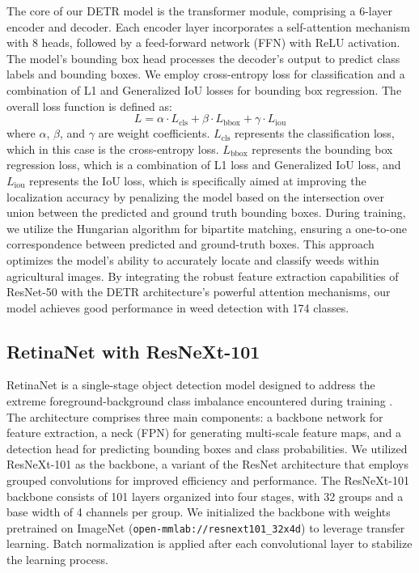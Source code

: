 The core of our DETR model is the transformer module, comprising a 6-layer encoder and decoder. Each encoder layer incorporates a self-attention mechanism with 8 heads, followed by a feed-forward network (FFN) with ReLU activation. The model's bounding box head processes the decoder's output to predict class labels and bounding boxes. We employ cross-entropy loss for classification and a combination of L1 and Generalized IoU losses for bounding box regression. The overall loss function \cite{yin2019context} is defined as:
\vspace{-0.2cm}
\begin{equation}
L = \alpha \cdot L_{\text{cls}} + \beta \cdot L_{\text{bbox}} + \gamma \cdot L_{\text{iou}}
\end{equation}
where \(\alpha\), \(\beta\), and \(\gamma\) are weight coefficients. \( L_{\text{cls}} \) represents the classification loss, which in this case is the cross-entropy loss. \( L_{\text{bbox}} \) represents the bounding box regression loss, which is a combination of L1 loss and Generalized IoU loss, and \( L_{\text{iou}} \) 	represents the IoU loss, which is specifically aimed at improving the localization accuracy by penalizing the model based on the intersection over union between the predicted and ground truth bounding boxes. During training, we utilize the Hungarian algorithm \cite{ye2020cost} for bipartite matching, ensuring a one-to-one correspondence between predicted and ground-truth boxes. This approach optimizes the model's ability to accurately locate and classify weeds within agricultural images. By integrating the robust feature extraction capabilities of ResNet-50 with the DETR architecture's powerful attention mechanisms, our model achieves good performance in weed detection with 174 classes.

\subsection{RetinaNet with ResNeXt-101}

RetinaNet is a single-stage object detection model designed to address the extreme foreground-background class imbalance encountered during training \cite{li2019light}. The architecture comprises three main components: a backbone network for feature extraction, a neck (FPN) for generating multi-scale feature maps, and a detection head for predicting bounding boxes and class probabilities. We utilized ResNeXt-101 as the backbone, a variant of the ResNet architecture that employs grouped convolutions for improved efficiency and performance. The ResNeXt-101 backbone consists of 101 layers organized into four stages, with 32 groups and a base width of 4 channels per group. We initialized the backbone with weights pretrained on ImageNet (\texttt{open-mmlab://resnext101\_32x4d}) to leverage transfer learning. Batch normalization is applied after each convolutional layer to stabilize the learning process.

